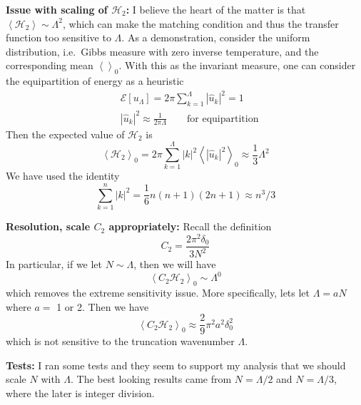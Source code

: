 \documentclass[11pt]{article}
\newcommand{\vsp}[1]{\vspace{#1 pc} \noindent}
\newcommand{\seclabel}[1]{\vsp{1} {\bf#1:}}
\newcommand{\abs}[1]{\left| #1 \right|}
\newcommand{\mean}[1]{\left< #1 \right>}
\newcommand{\lamfac}{N}
\newcommand{\En}{\mathcal{E}}
\newcommand{\delup}{\delta_0}
\newcommand{\uhat}{\hat{u}}
\newcommand{\Ham}{\mathcal{H}}
\newcommand{\Htwo}{\Ham_{2}}
\newcommand{\uL}{u_{\Lambda}}
\begin{document}
\seclabel{Issue with scaling of $\Htwo$}
I believe the heart of the matter is that $\mean{\Htwo} \sim \Lambda^2$, which can make the matching condition and thus the transfer function too sensitive to $\Lambda$. As a demonstration, consider the uniform distribution, i.e.~Gibbs measure with zero inverse temperature, and the corresponding mean $\mean{}_0$. With this as the invariant measure, one can consider the equipartition of energy as a heuristic
\begin{align}
&\En[\uL] = 2 \pi \sum_{k=1}^{\Lambda} \abs{\uhat_k}^2 = 1 \\
&\abs{\uhat_k}^2 \approx \frac{1}{2 \pi \Lambda}	 \qquad \mbox{for equipartition}
\end{align}
Then the expected value of $\Htwo$ is
\begin{equation}
\mean{\Htwo}_0 = 2 \pi \sum_{k=1}^{\Lambda} \abs{k}^ 2 \mean{\abs{\uhat_k}^2}_0 \approx \frac{1}{3} \Lambda^2
\end{equation}
We have used the identity
\begin{equation}
\sum_{k=1}^{n} \abs{k}^ 2 = \frac{1}{6} n(n+1)(2n+1) \approx n^3/3
\end{equation}

\seclabel{Resolution, scale $C_2$ appropriately}
Recall the definition
\begin{equation}
C_2 = \frac{2 \pi^2 \delup}{3 \lamfac^2} 
\end{equation}
In particular, if we let $\lamfac \sim \Lambda$, then we will have
\begin{equation}
\mean{C_2 \Htwo}_0 \sim \Lambda^0 
\end{equation}
which removes the extreme sensitivity issue. More specifically, lets let $\Lambda = a \lamfac$ where $a = $ 1 or 2. Then we have
\begin{equation}
\mean{C_2 \Htwo}_0 \approx \frac{2}{9} \pi^2 a^2 \delup^2
\end{equation}
which is not sensitive to the truncation wavenumber $\Lambda$.

\seclabel{Tests}
I ran some tests and they seem to support my analysis that we should scale $
\lamfac$ with $\Lambda$. The best looking results came from $\lamfac = \Lambda/2$ and $\lamfac = \Lambda/3$, where the later is integer division.
\end{document}
